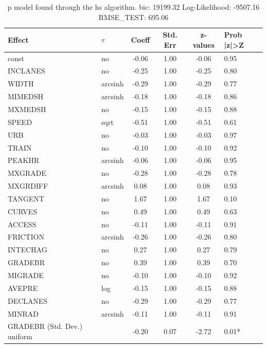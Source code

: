 \begin{table}
	\caption{p model found through the hs algorithm. bic: 19199.32 Log-Likelihood: -9507.16 RMSE_TEST: 695.06}
	\begin{center}
		\begin{tabular}{|l|l|c|c|c|l|}
			\hline
			Effect & $\tau$ & Coeff & Std. Err & z-values & Prob |z|>Z \\
			\hline
			const & no & -0.06 & 1.00 & -0.06 & 0.95 \\
			\hline
			INCLANES & no & -0.25 & 1.00 & -0.25 & 0.80 \\
			\hline
			WIDTH & arcsinh & -0.29 & 1.00 & -0.29 & 0.77 \\
			\hline
			MIMEDSH & arcsinh & -0.18 & 1.00 & -0.18 & 0.86 \\
			\hline
			MXMEDSH & no & -0.15 & 1.00 & -0.15 & 0.88 \\
			\hline
			SPEED & sqrt & -0.51 & 1.00 & -0.51 & 0.61 \\
			\hline
			URB & no & -0.03 & 1.00 & -0.03 & 0.97 \\
			\hline
			TRAIN & no & -0.10 & 1.00 & -0.10 & 0.92 \\
			\hline
			PEAKHR & arcsinh & -0.06 & 1.00 & -0.06 & 0.95 \\
			\hline
			MXGRADE & no & -0.28 & 1.00 & -0.28 & 0.78 \\
			\hline
			MXGRDIFF & arcsinh & 0.08 & 1.00 & 0.08 & 0.93 \\
			\hline
			TANGENT & no & 1.67 & 1.00 & 1.67 & 0.10 \\
			\hline
			CURVES & no & 0.49 & 1.00 & 0.49 & 0.63 \\
			\hline
			ACCESS & no & -0.11 & 1.00 & -0.11 & 0.91 \\
			\hline
			FRICTION & arcsinh & -0.26 & 1.00 & -0.26 & 0.80 \\
			\hline
			INTECHAG & no & 0.27 & 1.00 & 0.27 & 0.79 \\
			\hline
			GRADEBR & no & 0.39 & 1.00 & 0.39 & 0.70 \\
			\hline
			MIGRADE & no & -0.10 & 1.00 & -0.10 & 0.92 \\
			\hline
			AVEPRE & log & -0.15 & 1.00 & -0.15 & 0.88 \\
			\hline
			DECLANES & no & -0.29 & 1.00 & -0.29 & 0.77 \\
			\hline
			MINRAD & arcsinh & -0.11 & 1.00 & -0.11 & 0.91 \\
			\hline
			GRADEBR (Std. Dev.) uniform &  & -0.20 & 0.07 & -2.72 & 0.01* \\

\end{tabular}
\end{center}
\end{table}
